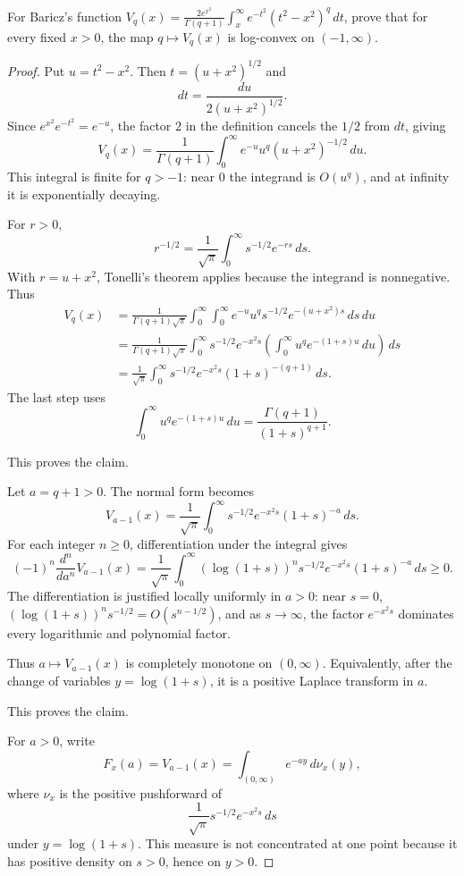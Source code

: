 \begin{proposition}
\label{res:baricz-vq-q-logconvexity-open-problem}
For Baricz's function \(V_q(x)=\frac{2e^{x^2}}{\Gamma(q+1)}\int_x^\infty e^{-t^2}(t^2-x^2)^q\,dt\), prove that for every fixed \(x>0\), the map \(q\mapsto V_q(x)\) is log-convex on \((-1,\infty)\).
\end{proposition}
\begin{proof}
Put \(u=t^2-x^2\). Then \(t=(u+x^2)^{1/2}\) and
\[
dt=\frac{du}{2(u+x^2)^{1/2}}.
\]
Since \(e^{x^2}e^{-t^2}=e^{-u}\), the factor \(2\) in the definition cancels the \(1/2\) from \(dt\), giving
\[
V_q(x)=\frac1{\Gamma(q+1)}
\int_0^\infty e^{-u}u^q(u+x^2)^{-1/2}\,du.
\]
This integral is finite for \(q>-1\): near \(0\) the integrand is \(O(u^q)\), and at infinity it is exponentially decaying.

For \(r>0\),
\[
r^{-1/2}=\frac1{\sqrt\pi}\int_0^\infty s^{-1/2}e^{-rs}\,ds.
\]
With \(r=u+x^2\), Tonelli's theorem applies because the integrand is nonnegative. Thus
\[
\begin{aligned}
V_q(x)
&=\frac1{\Gamma(q+1)\sqrt\pi}
\int_0^\infty\int_0^\infty
e^{-u}u^q s^{-1/2}e^{-(u+x^2)s}\,ds\,du\\
&=\frac1{\Gamma(q+1)\sqrt\pi}
\int_0^\infty s^{-1/2}e^{-x^2s}
\left(\int_0^\infty u^q e^{-(1+s)u}\,du\right)\,ds\\
&=\frac1{\sqrt\pi}\int_0^\infty
s^{-1/2}e^{-x^2s}(1+s)^{-(q+1)}\,ds.
\end{aligned}
\]
The last step uses
\[
\int_0^\infty u^q e^{-(1+s)u}\,du
=\frac{\Gamma(q+1)}{(1+s)^{q+1}}.
\]

This proves the claim.

Let \(a=q+1>0\). The normal form becomes
\[
V_{a-1}(x)=\frac1{\sqrt\pi}\int_0^\infty
s^{-1/2}e^{-x^2s}(1+s)^{-a}\,ds.
\]
For each integer \(n\ge0\), differentiation under the integral gives
\[
(-1)^n\frac{d^n}{da^n}V_{a-1}(x)
=\frac1{\sqrt\pi}\int_0^\infty
(\log(1+s))^n s^{-1/2}e^{-x^2s}(1+s)^{-a}\,ds\ge0.
\]
The differentiation is justified locally uniformly in \(a>0\): near \(s=0\), \((\log(1+s))^n s^{-1/2}=O(s^{n-1/2})\), and as \(s\to\infty\), the factor \(e^{-x^2s}\) dominates every logarithmic and polynomial factor.

Thus \(a\mapsto V_{a-1}(x)\) is completely monotone on \((0,\infty)\). Equivalently, after the change of variables \(y=\log(1+s)\), it is a positive Laplace transform in \(a\).

This proves the claim.

For \(a>0\), write
\[
F_x(a)=V_{a-1}(x)
=\int_{(0,\infty)} e^{-ay}\,d\nu_x(y),
\]
where \(\nu_x\) is the positive pushforward of
\[
\frac1{\sqrt\pi}s^{-1/2}e^{-x^2s}\,ds
\]
under \(y=\log(1+s)\). This measure is not concentrated at one point because it has positive density on \(s>0\), hence on \(y>0\).


\end{proof}
